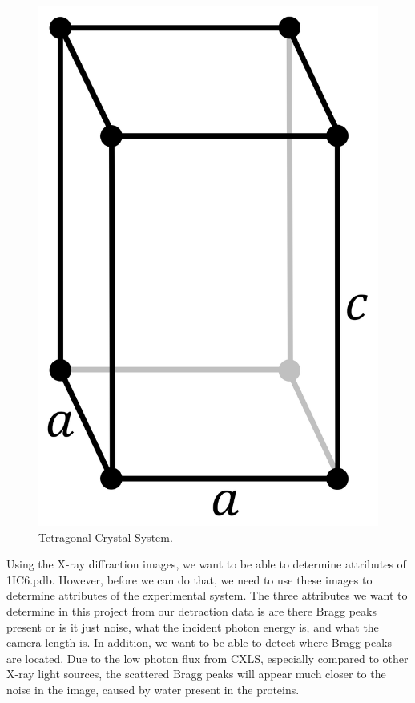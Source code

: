\documentclass[12pt]{article}
\begin{document}
\begin{figure}[H]
    \centering
    \includegraphics[scale=0.08]{tetragonal.png}
    \caption{Tetragonal Crystal System.}
    \label{fig:tetragonal}
\end{figure}

Using the X-ray diffraction images, we want to be able to determine attributes of 1IC6.pdb. However, before we can do that, we need to use these images to determine attributes of the experimental system. The three attributes we want to determine in this project from our detraction data is are there Bragg peaks present or is it just noise, what the incident photon energy is, and what the camera length is. In addition, we want to be able to detect where Bragg peaks are located. Due to the low photon flux from CXLS, especially compared to other X-ray light sources, the scattered Bragg peaks will appear much closer to the noise in the image, caused by water present in the proteins.
\end{document}
